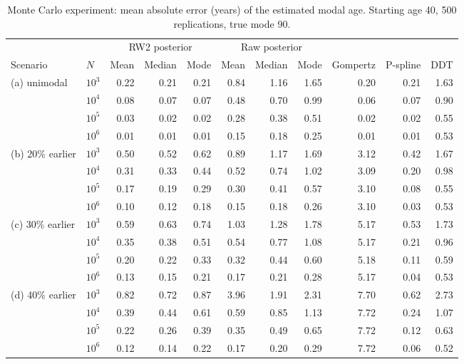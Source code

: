 \begin{table}[htb!]
\centering
\caption{Monte Carlo experiment: mean absolute error (years) of the estimated modal age. Starting age 40, 500 replications, true mode 90.}
\label{tab:app_mae}
\scriptsize
\setlength{\tabcolsep}{4pt}
\begin{tabular}{llrrrrrrrrr}
\hline
 & & \multicolumn{3}{c}{RW2 posterior} & \multicolumn{3}{c}{Raw posterior} & & & \\
Scenario & $N$ & Mean & Median & Mode & Mean & Median & Mode & Gompertz & P-spline & DDT \\
\hline
(a) unimodal & $10^3$ & 0.22 & 0.21 & 0.21 & 0.84 & 1.16 & 1.65 & 0.20 & 0.21 & 1.63 \\
 & $10^4$ & 0.08 & 0.07 & 0.07 & 0.48 & 0.70 & 0.99 & 0.06 & 0.07 & 0.90 \\
 & $10^5$ & 0.03 & 0.02 & 0.02 & 0.28 & 0.38 & 0.51 & 0.02 & 0.02 & 0.55 \\
 & $10^6$ & 0.01 & 0.01 & 0.01 & 0.15 & 0.18 & 0.25 & 0.01 & 0.01 & 0.53 \\[2pt]
(b) 20\% earlier & $10^3$ & 0.50 & 0.52 & 0.62 & 0.89 & 1.17 & 1.69 & 3.12 & 0.42 & 1.67 \\
 & $10^4$ & 0.31 & 0.33 & 0.44 & 0.52 & 0.74 & 1.02 & 3.09 & 0.20 & 0.98 \\
 & $10^5$ & 0.17 & 0.19 & 0.29 & 0.30 & 0.41 & 0.57 & 3.10 & 0.08 & 0.55 \\
 & $10^6$ & 0.10 & 0.12 & 0.18 & 0.15 & 0.18 & 0.26 & 3.10 & 0.03 & 0.53 \\[2pt]
(c) 30\% earlier & $10^3$ & 0.59 & 0.63 & 0.74 & 1.03 & 1.28 & 1.78 & 5.17 & 0.53 & 1.73 \\
 & $10^4$ & 0.35 & 0.38 & 0.51 & 0.54 & 0.77 & 1.08 & 5.17 & 0.21 & 0.96 \\
 & $10^5$ & 0.20 & 0.22 & 0.33 & 0.32 & 0.44 & 0.60 & 5.18 & 0.11 & 0.59 \\
 & $10^6$ & 0.13 & 0.15 & 0.21 & 0.17 & 0.21 & 0.28 & 5.17 & 0.04 & 0.53 \\[2pt]
(d) 40\% earlier & $10^3$ & 0.82 & 0.72 & 0.87 & 3.96 & 1.91 & 2.31 & 7.70 & 0.62 & 2.73 \\
 & $10^4$ & 0.39 & 0.44 & 0.61 & 0.59 & 0.85 & 1.13 & 7.72 & 0.24 & 1.07 \\
 & $10^5$ & 0.22 & 0.26 & 0.39 & 0.35 & 0.49 & 0.65 & 7.72 & 0.12 & 0.63 \\
 & $10^6$ & 0.12 & 0.14 & 0.22 & 0.17 & 0.20 & 0.29 & 7.72 & 0.06 & 0.52 \\
\hline
\end{tabular}
\end{table}
